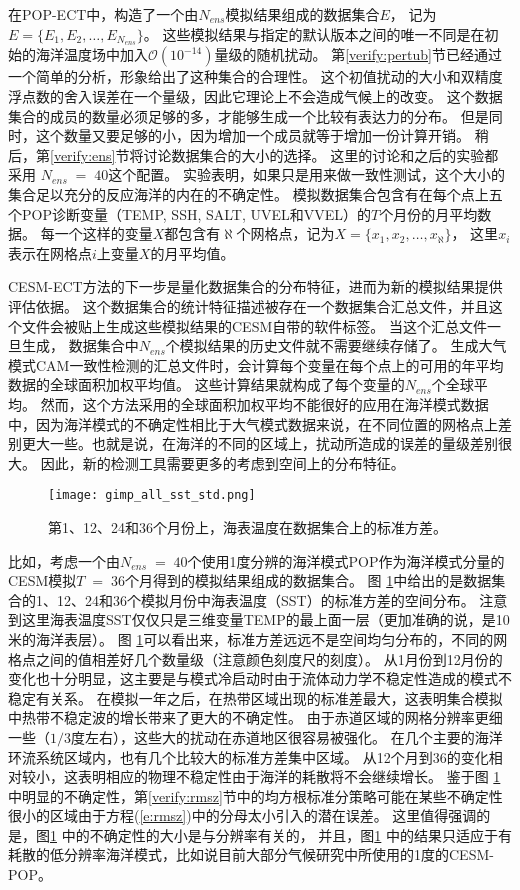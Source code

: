  
在POP-ECT中，构造了一个由$N_{ens}$模拟结果组成的数据集合$E$， 记为 $E =\{E_1, E_2, \dots, E_{N_{ens}} \}$。
这些模拟结果与指定的默认版本之间的唯一不同是在初始的海洋温度场中加入$\mathcal{O}(10^{-14})$量级的随机扰动。 
第\ref{verify:pertub}节已经通过一个简单的分析，形象给出了这种集合的合理性。
这个初值扰动的大小和双精度浮点数的舍入误差在一个量级，因此它理论上不会造成气候上的改变。
这个数据集合的成员的数量必须足够的多，才能够生成一个比较有表达力的分布。
但是同时，这个数量又要足够的小，因为增加一个成员就等于增加一份计算开销。 
稍后，第\ref{verify:ens}节将讨论数据集合的大小的选择。
这里的讨论和之后的实验都采用 $N_{ens} \;=\; 40$这个配置。
实验表明，如果只是用来做一致性测试，这个大小的集合足以充分的反应海洋的内在的不确定性。
模拟数据集合包含有在每个点上五个POP诊断变量（TEMP, SSH, SALT, UVEL和VVEL）的$T$个月份的月平均数据。
每一个这样的变量$X$都包含有$\aleph$个网格点，记为${X} = \{ x_1, x_2, \dots, x_{\aleph}\}$， 这里$x_i$ 表示在网格点$i$上变量$X$的月平均值。
 
CESM-ECT方法的下一步是量化数据集合的分布特征，进而为新的模拟结果提供评估依据。
这个数据集合的统计特征描述被存在一个数据集合汇总文件，并且这个文件会被贴上生成这些模拟结果的CESM自带的软件标签。
当这个汇总文件一旦生成， 数据集合中$N_{ens}$个模拟结果的历史文件就不需要继续存储了。
生成大气模式CAM一致性检测的汇总文件时，会计算每个变量在每个点上的可用的年平均数据的全球面积加权平均值。
这些计算结果就构成了每个变量的$N_{ens}$个全球平均。 
然而，这个方法采用的全球面积加权平均不能很好的应用在海洋模式数据中，因为海洋模式的不确定性相比于大气模式数据来说，在不同位置的网格点上差别更大一些。也就是说，在海洋的不同的区域上，扰动所造成的误差的量级差别很大。
因此，新的检测工具需要更多的考虑到空间上的分布特征。 

\begin {figure} 
\centering
\texttt{[image: gimp\_all\_sst\_std.png]}
\caption{第1、12、24和36个月份上，海表温度在数据集合上的标准方差。}
\label{fig:SST_STD_all}
\end {figure}

比如，考虑一个由$N_{ens} \;=\; 40$个使用1度分辨的海洋模式POP作为海洋模式分量的CESM模拟$T\;=\;36$个月得到的模拟结果组成的数据集合。 
图 \ref{fig:SST_STD_all}中给出的是数据集合的1、12、24和36个模拟月份中海表温度（SST）的标准方差的空间分布。
注意到这里海表温度SST仅仅只是三维变量TEMP的最上面一层（更加准确的说，是10米的海洋表层）。
图 \ref{fig:SST_STD_all}可以看出来，标准方差远远不是空间均匀分布的，不同的网格点之间的值相差好几个数量级（注意颜色刻度尺的刻度）。 
从1月份到12月份的变化也十分明显，这主要是与模式冷启动时由于流体动力学不稳定性造成的模式不稳定有关系。  
在模拟一年之后，在热带区域出现的标准差最大，这表明集合模拟中热带不稳定波的增长带来了更大的不确定性\cite{legeckis1977}。
由于赤道区域的网格分辨率更细一些（$1/3$度左右），这些大的扰动在赤道地区很容易被强化。 
在几个主要的海洋环流系统区域内，也有几个比较大的标准方差集中区域。
从12个月到36的变化相对较小，这表明相应的物理不稳定性由于海洋的耗散将不会继续增长。
鉴于图 \ref{fig:SST_STD_all}中明显的不确定性，第\ref{verify:rmsz}节中的均方根标准分策略可能在某些不确定性很小的区域由于方程(\ref{e:rmsz})中的分母太小引入的潜在误差。
这里值得强调的是，图\ref{fig:SST_STD_all} 中的不确定性的大小是与分辨率有关的，
并且，图\ref{fig:SST_STD_all} 中的结果只适应于有耗散的低分辨率海洋模式，比如说目前大部分气候研究中所使用的1度的CESM-POP。

